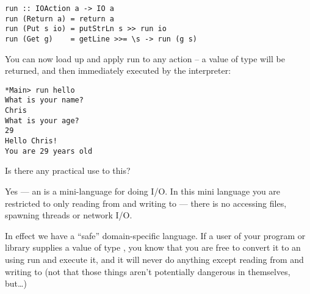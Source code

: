 \documentclass[thesis-solanki.tex]{subfiles}
\begin{document}
\begin{code-list}[H]
\begin{singlespace}
\begin{verbatim}
run :: IOAction a -> IO a
run (Return a) = return a
run (Put s io) = putStrLn s >> run io
run (Get g)    = getLine >>= \s -> run (g s)
\end{verbatim}
\end{singlespace}
\caption{}
\label{}
\end{code-list}



You can now load up  and apply run to any action --
a value of type   will be returned, and then immediately executed by the 
interpreter:


\begin{code-list}[H]
\begin{singlespace}
\begin{verbatim}
*Main> run hello
What is your name?
Chris
What is your age?
29
Hello Chris!
You are 29 years old
\end{verbatim}
\end{singlespace}
\caption{}
\label{}
\end{code-list}





Is there any practical use to this?

Yes ---
an  is a mini-language for doing I/O. In this mini language you are restricted to only reading from  and writing to  ---
there is no accessing files, spawning threads or network I/O.

In effect we have a 
``safe'' domain-specific language.
If a user of your program or library supplies a value of type  , you know that you are free to convert it to an   using run and execute it, 
and it will never do anything except reading from  and writing to  (not that those things aren't potentially dangerous in themselves, but\dots)

\begin{code-list}[H]

\begin{singlespace}
  \inputminted[linenos]{haskell}{haskell-proto4-purvey-wincer.hs}
\end{singlespace}

\caption{}
\label{}
\end{code-list}
\end{document}
